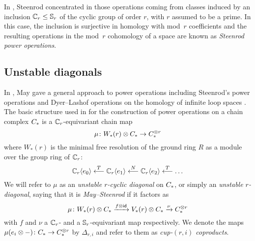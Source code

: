 In \cite{steenrod1953cyclic}, Steenrod concentrated in those operations coming from classes induced by an inclusion $\mathbb{C}_r \leq \mathbb{S}_r$ of the cyclic group of order $r$, with $r$ assumed to be a prime.
In this case, the inclusion is surjective in homology with mod~$r$ coefficients and the resulting operations in the mod~$r$ cohomology of a space are known as \textit{Steenrod power operations}.

\subsection{Unstable diagonals}

In \cite{may1970general}, May gave a general approach to power operations including Steenrod's power operations \cite{steenrod1962cohomology} and Dyer--Lashof operations on the homology of infinite loop spaces \cite{dyer62lashof}.
The basic structure used in \cite{may1970general} for the construction of power operations on a chain complex $C_{*}$ is a $\mathbb{C}_r$-equivariant chain map
\[
\mu \colon W_*(r) \otimes C_{*} \to C_{*}^{\otimes r}
\]
where $W_*(r)$ is the minimal free resolution of the ground ring $R$ as a module over the group ring of $\mathbb{C}_r$:
\[
\mathbb{C}_r\langle e_0\rangle
\overset{T}{\longleftarrow}
\mathbb{C}_r\langle e_1\rangle 
\overset{N}{\longleftarrow}
\mathbb{C}_r\langle e_2\rangle 
\overset{T}{\longleftarrow}
\ldots
\]
We will refer to $\mu$ as an \textit{unstable $r$-cyclic diagonal} on $C_{*}$, or simply an \textit{unstable $r$-diagonal}, saying that it is \textit{May--Steenrod} if it factors as
\[
\mu \colon W_*(r) \otimes C_{*} \xrightarrow{f \otimes \mathsf{id}} V_*(r) \otimes C_{*} \xrightarrow{\nu} C_{*}^{\otimes r}
\]
with $f$ and $\nu$ a $\mathbb{C}_r$- and a $\mathbb{S}_r$-equivariant map respectively.
We denote the maps $\mu(e_i \otimes -) \colon C_{*} \to C_{*}^{\otimes r}$ by $\Delta_{r,i}$ and refer to them as \textit{cup-$(r,i)$ coproducts}.

